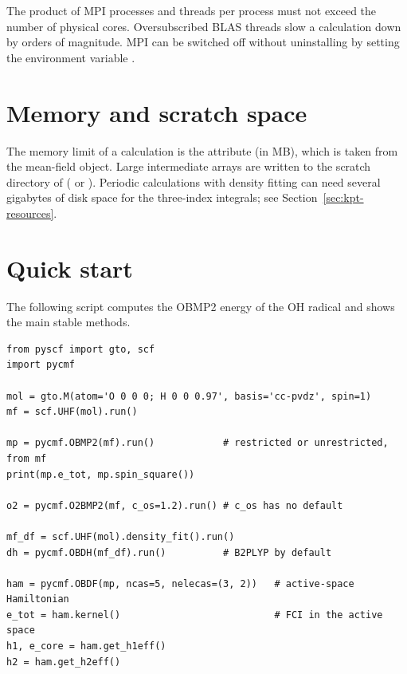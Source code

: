 The product of MPI processes and threads per process must not exceed the
number of physical cores. Oversubscribed BLAS threads slow a calculation down
by orders of magnitude. MPI can be switched off without uninstalling
 by setting the environment variable .

\section{Memory and scratch space}

The memory limit of a calculation is the attribute  (in MB),
which is taken from the mean-field object. Large intermediate arrays are
written to the scratch directory of \pyscf{} ( or
). Periodic calculations with density fitting
can need several gigabytes of disk space for the three-index integrals; see
Section~\ref{sec:kpt-resources}.

\section{Quick start}

The following script computes the OBMP2 energy of the OH radical and shows
the main stable methods.

\begin{lstlisting}[style=python]
from pyscf import gto, scf
import pycmf

mol = gto.M(atom='O 0 0 0; H 0 0 0.97', basis='cc-pvdz', spin=1)
mf = scf.UHF(mol).run()

mp = pycmf.OBMP2(mf).run()            # restricted or unrestricted, from mf
print(mp.e_tot, mp.spin_square())

o2 = pycmf.O2BMP2(mf, c_os=1.2).run() # c_os has no default

mf_df = scf.UHF(mol).density_fit().run()
dh = pycmf.OBDH(mf_df).run()          # B2PLYP by default

ham = pycmf.OBDF(mp, ncas=5, nelecas=(3, 2))   # active-space Hamiltonian
e_tot = ham.kernel()                           # FCI in the active space
h1, e_core = ham.get_h1eff()
h2 = ham.get_h2eff()
\end{lstlisting}
